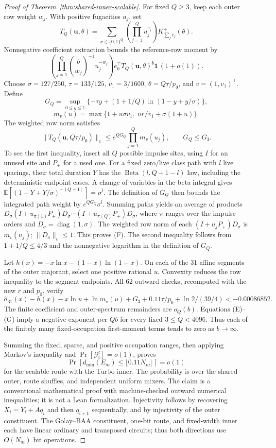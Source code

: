 \begin{proof}[Proof of Theorem~\ref{thm:shared-inner-scalable}]
For fixed $Q\ge3$, keep each outer row weight $w_j$. With positive
fugacities $u_j$, set
\[
 T_Q(\boldsymbol u,\theta)
 =\sum_{\boldsymbol e\in\{0,1\}^Q}
   \left(\prod_{j=1}^Q u_j^{e_j}\right)
   K_{\sum_j e_j}^+(\theta).
\]
Nonnegative coefficient extraction bounds the reference-row moment by
\[
 \left(\prod_{j=1}^Q\binom b{w_j}^{-1}u_j^{-w_j}\right)
 e_0^\top T_Q(\boldsymbol u,\theta)^b\mathbf1\,(1+o(1)).
 \tag{E}
\]
Choose $\sigma=127/250$, $\tau=133/125$,
$v_1=3/1600$, $\theta=Q\tau/p_0$, and $v=(1,v_1)^\top$. Define
\[
 G_Q=\sup_{0\le y\le1}
  \{-\tau y+(1+1/Q)\ln(1-y+y/\sigma)\},
\]
\[
 m_v(u)=\max\{1+u\sigma v_1,\;ur/v_1+\sigma(1+u)\}.
\]
The weighted row norm satisfies
\[
 \|T_Q(\boldsymbol u,Q\tau/p_0)\|_v
 \le e^{QG_Q}\prod_{j=1}^Qm_v(u_j),\qquad G_Q\le G_3.
 \tag{F}
\]
To see the first inequality, insert all $Q$ possible impulse sites,
using $I$ for an unused site and $P_+$ for a used one. For a fixed
zero/live class path with $l$ live spacings, their total duration $Y$
has the $\operatorname{Beta}(l,Q+1-l)$ law, including the deterministic
endpoint cases. A change of variables in the beta integral gives
$\mathbb E[(1-Y+Y/\sigma)^{-(Q+1)}]=\sigma^l$. The definition of
$G_Q$ then bounds the integrated path weight by
$e^{QG_Q}\sigma^l$. Summing paths yields an average of products
$D_\sigma(I+u_{\pi(1)}P_+)D_\sigma\cdots
 (I+u_{\pi(Q)}P_+)D_\sigma$, where $\pi$ ranges over the impulse
orders and $D_\sigma=\operatorname{diag}(1,\sigma)$.
The weighted row norm of each $(I+u_jP_+)D_\sigma$ is $m_v(u_j)$;
$\|D_\sigma\|_v\le1$. This proves (F). The second inequality follows
from $1+1/Q\le4/3$ and the nonnegative logarithm in the definition
of $G_Q$.

Let $h(x)=-x\ln x-(1-x)\ln(1-x)$. On each of the $31$ affine
segments of the outer majorant, select one positive rational $u$.
Convexity reduces the row inequality to the segment endpoints. All
$62$ outward checks, recomputed with the new $r$ and $p_0$, verify
\[
 \widehat a_{31}(x)-h(x)-x\ln u+\ln m_v(u)
 +G_3+0.11\tau/p_0+\ln2/(39/4)<-0.00086852.
 \tag{G}
\]
The finite coefficient and outer-spectrum remainders are $o_Q(b)$.
Equations (E)--(G) imply a negative exponent per $Qb$ for every
fixed $3\le Q<4096$. Thus each of the finitely many fixed-occupation
first-moment terms tends to zero as $b\to\infty$.

Summing the fixed, sparse, and positive occupation ranges, then
applying Markov's inequality and $\Pr[\mathcal G_b^c]=o(1)$, proves
\[
 \Pr[d_{\min}(E_m)\le\lfloor0.11N_m\rfloor]=o(1)
\]
for the scalable route with the Turbo inner. The probability is over
the shared outer, route shuffles, and independent uniform mixers. The
claim is a conventional mathematical proof with machine-checked
outward numerical inequalities; it is not a Lean formalization.
Injectivity follows by recovering $X_i=Y_i+Aq_i$ and then $q_{i+1}$
sequentially, and by injectivity of the outer constituent. The
Golay--BAA constituent, one-bit route, and fixed-width inner each have
linear ordinary and transposed circuits; thus both directions use
$O(N_m)$ bit operations.
\end{proof}

